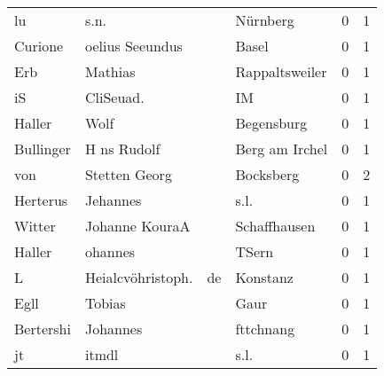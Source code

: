 \begin{center}
\begin{tiny}
\begin{longtabu}{llllrr}
                       lu &                               s.n. &             &                                    Nürnberg &          0 &         1 \\
                  Curione &                    oelius Seeundus &             &                                       Basel &          0 &         1 \\
                      Erb &                            Mathias &             &                              Rappaltsweiler &          0 &         1 \\
                       iS &                          CliSeuad. &             &                                          IM &          0 &         1 \\
                   Haller &                               Wolf &             &                                  Begensburg &          0 &         1 \\
                Bullinger &                        H ns Rudolf &             &                              Berg am Irchel &          0 &         1 \\
                      von &                      Stetten Georg &             &                                   Bocksberg &          0 &         2 \\
                 Herterus &                           Jehannes &             &                                        s.l. &          0 &         1 \\
                   Witter &                     Johanne KouraA &             &                                Schaffhausen &          0 &         1 \\
                   Haller &                            ohannes &             &                                       TSern &          0 &         1 \\
                        L &                  Heialcvöhristoph. &          de &                                    Konstanz &          0 &         1 \\
                     Egll &                             Tobias &             &                                        Gaur &          0 &         1 \\
                Bertershi &                           Johannes &             &                                   fttchnang &          0 &         1 \\
                       jt &                              itmdl &             &                                        s.l. &          0 &         1 \\

\end{longtabu}
\end{tiny}
\end{center}

